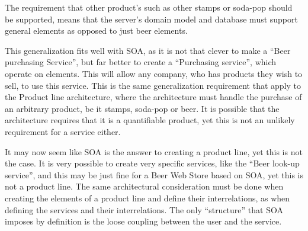 The requirement that other product's such as other stamps or soda-pop should be supported, means that the server's domain model and database must support general elements as opposed to just beer elements.

This generalization fits well with SOA, as it is not that clever to make a ``Beer purchasing Service'', but far better to create a ``Purchasing service'', which operate on elements. This will allow any company, who has products they wish to sell, to use this service. This is the same generalization requirement that apply to the Product line architecture, where the architecture must handle the purchase of an arbitrary product, be it stamps, soda-pop or beer. It is possible that the architecture requires that it is a quantifiable product, yet this is not an unlikely requirement for a service either.

It may now seem like SOA is the answer to creating a product line, yet this is not the case. It is very possible to create very specific services, like the ``Beer look-up service'', and this may be just fine for a Beer Web Store based on SOA, yet this is not a product line. The same architectural consideration must be done when creating the elements of a product line and define their interrelations, as when defining the services and their interrelations. The only ``structure'' that SOA imposes by definition is the loose coupling between the user and the service.
